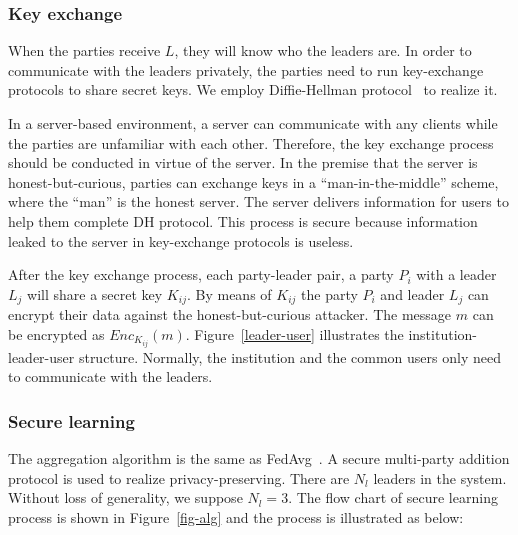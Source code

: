 \subsubsection{\textbf{Key exchange}}
When the parties receive $L$, they will know who the leaders are. In order to communicate with the leaders privately, the parties need to run key-exchange protocols to share secret keys. We employ Diffie-Hellman protocol~\cite{DH} to realize it. 

In a server-based environment, a server can communicate with any clients while the parties are unfamiliar with each other. Therefore, the key exchange process should be conducted in virtue of the server. In the premise that the server is honest-but-curious, parties can exchange keys in a ``man-in-the-middle'' scheme, where the ``man'' is the honest server. The server delivers information for users to help them complete DH protocol. This process is secure because information leaked to the server in key-exchange protocols is useless.

After the key exchange process, each party-leader pair, a party $P_i$ with a leader $L_j$ will share a secret key $K_{ij}$. By means of $K_{ij}$ the party $P_i$ and leader $L_j$ can encrypt their data against the honest-but-curious attacker. The message $m$ can be encrypted as $Enc_{K_{ij}}(m)$. Figure~\ref{leader-user} illustrates the institution-leader-user structure. Normally, the institution and the common users only need to communicate with the leaders.

\subsubsection{\textbf{Secure learning}}
The aggregation algorithm is the same as FedAvg~\cite{mcmahan2016communicationefficient}. A secure multi-party addition protocol is used to realize privacy-preserving. There are $N_l$ leaders in the system. Without loss of generality, we suppose $N_l = 3$. The flow chart of secure learning process is shown in Figure~\ref{fig-alg} and the process is illustrated as below:

